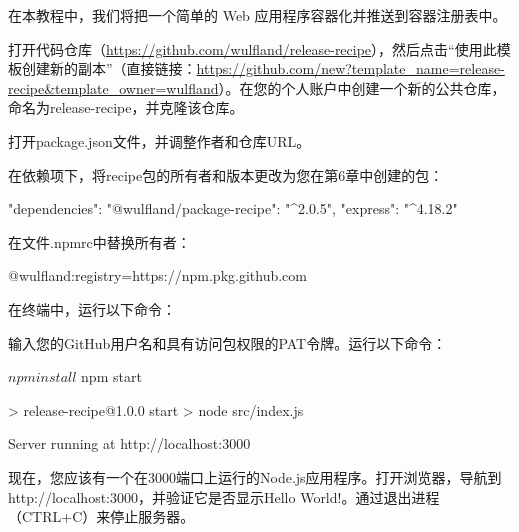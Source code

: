 在本教程中，我们将把一个简单的 Web 应用程序容器化并推送到容器注册表中。


打开代码仓库（\url{https://github.com/wulfland/release-recipe}），然后点击“使用此模板创建新的副本”（直接链接：\url{https://github.com/new?template_name=release-recipe&template_owner=wulfland}）。在您的个人账户中创建一个新的公共仓库，命名为release-recipe，并克隆该仓库。

打开package.json文件，并调整作者和仓库URL。

在依赖项下，将recipe包的所有者和版本更改为您在第6章中创建的包：

\begin{shell}
"dependencies": {
  "@wulfland/package-recipe": "^2.0.5",
  "express": "^4.18.2"
}
\end{shell}

在文件.npmrc中替换所有者：

\begin{shell}
@wulfland:registry=https://npm.pkg.github.com
\end{shell}

在终端中，运行以下命令：


输入您的GitHub用户名和具有访问包权限的PAT令牌。运行以下命令：

\begin{shell}
$ npm install
$ npm start

> release-recipe@1.0.0 start
> node src/index.js

Server running at http://localhost:3000
\end{shell}

现在，您应该有一个在3000端口上运行的Node.js应用程序。打开浏览器，导航到http://localhost:3000，并验证它是否显示Hello World!。通过退出进程（CTRL+C）来停止服务器。


